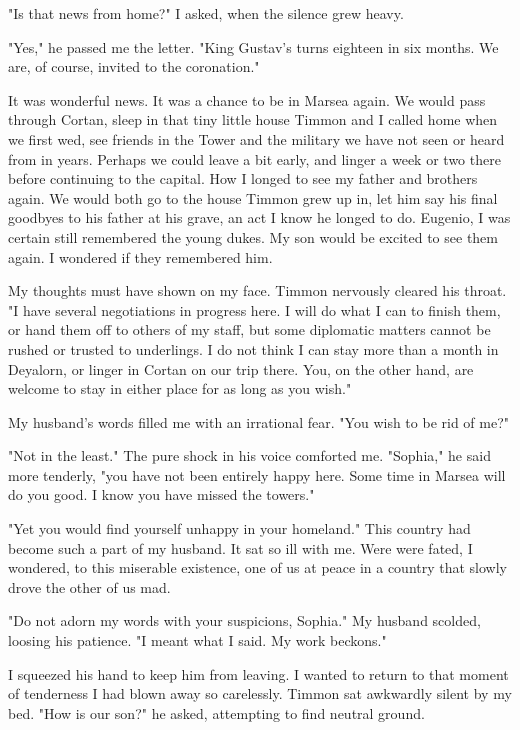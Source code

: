 \documentclass{article}
\begin{document}
"Is that news from home?" I asked, when the silence grew heavy.

"Yes," he passed me the letter. "King Gustav's turns eighteen in six months. We are, of course, invited to the coronation."

It was wonderful news. It was a chance to be in Marsea again. We would pass through Cortan, sleep in that tiny little house Timmon and I called home when we first wed, see friends in the Tower and the military we have not seen or heard from in years. Perhaps we could leave a bit early, and linger a week or two there before continuing to the capital. How I longed to see my father and brothers again. We would both go to the house Timmon grew up in, let him say his final goodbyes to his father at his grave, an act I know he longed to do. Eugenio, I was certain still remembered the young dukes. My son would be excited to see them again. I wondered if they remembered him.

My thoughts must have shown on my face. Timmon nervously cleared his throat. "I have several negotiations in progress here. I will do what I can to finish them, or hand them off to others of my staff, but some diplomatic matters cannot be rushed or trusted to underlings. I do not think I can stay more than a month in Deyalorn, or linger in Cortan on our trip there. You, on the other hand, are welcome to stay in either place for as long as you wish."

My husband's words filled me with an irrational fear. "You wish to be rid of me?"

"Not in the least." The pure shock in his voice comforted me. "Sophia," he said more tenderly, "you have not been entirely happy here. Some time in Marsea will do you good. I know you have missed the towers."

"Yet you would find yourself unhappy in your homeland." This country had become such a part of my husband. It sat so ill with me. Were were fated, I wondered, to this miserable existence, one of us at peace in a country that slowly drove the other of us mad. 

"Do not adorn my words with your suspicions, Sophia." My husband scolded, loosing his patience. "I meant what I said. My work beckons."

I squeezed his hand to keep him from leaving. I wanted to return to that moment of tenderness I had blown away so carelessly. Timmon sat awkwardly silent by my bed. "How is our son?" he asked, attempting to find neutral ground.
\end{document}
